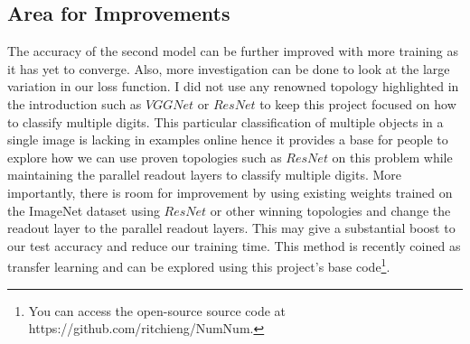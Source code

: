 \documentclass[twoside, column]{article}
\begin{document}
\subsection{Area for Improvements}
The accuracy of the second model can be further improved with more training as it has yet to converge. Also, more investigation can be done to look at the large variation in our loss function. I did not use any renowned topology highlighted in the introduction such as $VGGNet$ or $ResNet$ to keep this project focused on how to classify multiple digits. This particular classification of multiple objects in a single image is lacking in examples online hence it provides a base for people to explore how we can use proven topologies such as $ResNet$ on this problem while maintaining the parallel readout layers to classify multiple digits. More importantly, there is room for improvement by using existing weights trained on the ImageNet dataset using $ResNet$ or other winning topologies and change the readout layer to the parallel readout layers. This may give a substantial boost to our test accuracy and reduce our training time. This method is recently coined as transfer learning and can be explored using this project's base code\footnote{You can access the open-source source code at https://github.com/ritchieng/NumNum.}.





\end{document}

